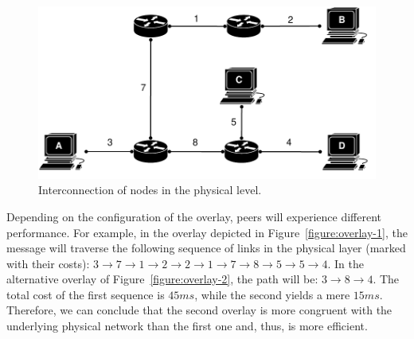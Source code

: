 \begin{figure}
\centering
  \includegraphics[scale=0.7]{img/pdf/example-physical.pdf}
\caption{Interconnection of nodes in the physical level.}
\label{figure:phys}
\end{figure}

Depending on the configuration of the overlay,
peers will experience different performance.
For example, in the overlay depicted in
Figure~\ref{figure:overlay-1}, the
message will traverse the following sequence of links in the physical layer
(marked with their costs): $3 \rightarrow 7 \rightarrow 1 \rightarrow 2
\rightarrow 2 \rightarrow 1 \rightarrow 7 \rightarrow 8 \rightarrow 5
\rightarrow 5 \rightarrow 4$. In the alternative overlay of
Figure~\ref{figure:overlay-2}, the path will be: $3 \rightarrow 8 \rightarrow
4$. The total cost of the first sequence is $45 ms$, while the second yields a
mere $15 ms$. Therefore, we can conclude that the second overlay is more
congruent with the underlying physical network than the first one and, thus, is
more efficient.

